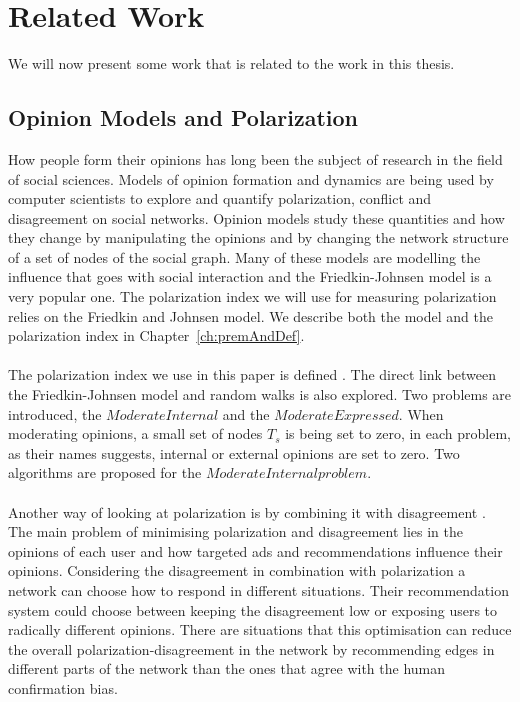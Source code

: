 \chapter{Related Work}
\label{ch:related}

We will now present some work that is related to the work in this thesis. 

\section{Opinion Models and Polarization}
\label{sec:opinionsModels}

How people form their opinions has long been the subject of research in the field of social sciences. Models of opinion formation and dynamics are being used  by computer scientists to explore and quantify polarization, conflict and disagreement on social networks. Opinion models study these quantities and how they change by manipulating the opinions and by changing the network structure of a set of nodes of the social graph. Many of these models are modelling the influence that goes with social interaction and the Friedkin-Johnsen model is a very popular one. The polarization index we will use for measuring polarization relies on the Friedkin and Johnsen model. We describe both the model and the polarization index in Chapter~\ref{ch:premAndDef}.
\\
\\
The polarization index we use in this paper is defined \cite{tsapMatakosTerzi}. The direct link between the Friedkin-Johnsen model and random walks is also explored. Two problems are introduced, the $ModerateInternal$ and the $ModerateExpressed$. When moderating opinions, a small set of nodes $T_s$ is being set to zero, in each problem, as their names suggests, internal or external opinions are set to zero. Two algorithms are proposed for the $ModerateInternal problem$.
\\
\\
Another way of looking at polarization is by combining it with disagreement \cite{musco}. The main problem of minimising polarization and disagreement lies in the opinions of each user and how targeted ads and recommendations influence their opinions.
Considering the disagreement in combination with polarization a network can choose how to respond in different situations. Their recommendation system could choose between keeping the disagreement low or exposing users to radically different opinions. 
There are situations that this optimisation can reduce the overall polarization-disagreement in the network by recommending edges in different parts of the network than the ones that agree with the human confirmation bias.
